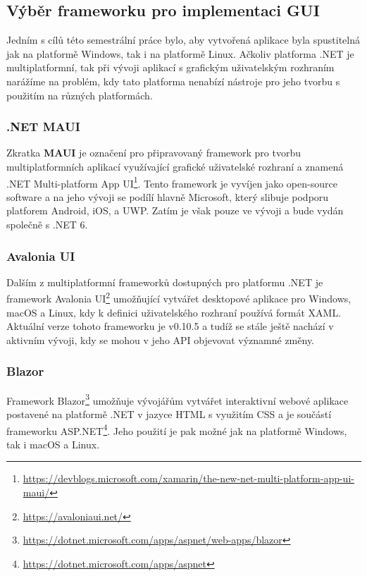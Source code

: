 \documentclass[12pt, a4paper]{article}
\begin{document}
    \subsection{Výběr frameworku pro implementaci GUI}
    Jedním s cílů této semestrální práce bylo, aby vytvořená aplikace byla spustitelná jak na platformě Windows, tak i na platformě Linux.
    Ačkoliv platforma .NET je multiplatformní, tak při vývoji aplikací s grafickým uživatelským rozhraním narážíme na problém,
    kdy tato platforma nenabízí nástroje pro jeho tvorbu s použitím na různých platformách.
    
    \subsubsection{.NET MAUI}
    Zkratka \textbf{MAUI} je označení pro připravovaný framework pro tvorbu multiplatformních aplikací využívající
    grafické uživatelské rozhraní a znamená .NET Multi-platform App UI\footnote{\url{https://devblogs.microsoft.com/xamarin/the-new-net-multi-platform-app-ui-maui/}}.
    Tento framework je vyvíjen jako open-source software a na jeho vývoji se podílí hlavně Microsoft, který slibuje podporu
    platforem Android, iOS, a UWP. Zatím je však pouze ve vývoji a bude vydán společně s .NET 6.

    \subsubsection{Avalonia UI}
    Dalším z multiplatformní frameworků dostupných pro platformu .NET je framework Avalonia UI\footnote{\url{https://avaloniaui.net/}}
    umožňující vytvářet desktopové aplikace pro Windows, macOS a Linux, kdy k definici uživatelského rozhraní používá formát
    XAML. Aktuální verze tohoto frameworku je v0.10.5 a tudíž se stále ještě nachází v aktivním vývoji, kdy se mohou v jeho API objevovat
    významné změny.

    \subsubsection{Blazor}
    Framework Blazor\footnote{\url{https://dotnet.microsoft.com/apps/aspnet/web-apps/blazor}} umožňuje vývojářům vytvářet
    interaktivní webové aplikace postavené na platformě .NET v jazyce HTML s využitím CSS a je součástí frameworku
    ASP.NET\footnote{\url{https://dotnet.microsoft.com/apps/aspnet}}.
    Jeho použití je pak možné jak na platformě Windows, tak i macOS a Linux.
    
\end{document}
